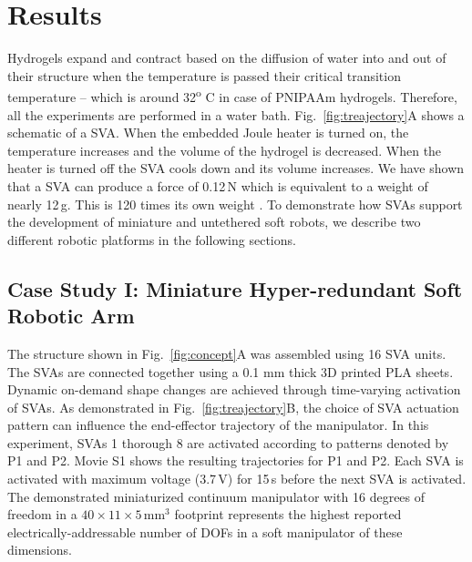\section{Results}
Hydrogels expand and contract based on the diffusion of water into and out of their structure when the temperature is passed their critical transition temperature -- which is around 32\textsuperscript{o} C in case of PNIPAAm hydrogels. Therefore, all the experiments are performed in a water bath. Fig.~\ref{fig:treajectory}A shows a schematic of a SVA. When the embedded Joule heater is turned on, the temperature increases and the volume of the hydrogel is decreased. When the heater is turned off the SVA cools down and its volume increases. We have shown that a SVA can produce a force of 0.12\,N which is equivalent to a weight of nearly 12\,g. This is 120 times its own weight \cite{Khodambashi2021}. To demonstrate how SVAs support the development of miniature and untethered soft robots, we describe two different robotic platforms in the following sections. 
\subsection{Case Study I: Miniature Hyper-redundant Soft Robotic Arm}
The structure shown in Fig.~\ref{fig:concept}A was assembled using 16 SVA units. The SVAs are connected together using a 0.1 mm thick 3D printed PLA sheets. Dynamic on-demand shape changes are achieved through time-varying activation of SVAs.
As demonstrated in Fig.~\ref{fig:treajectory}B, the choice of SVA actuation pattern can influence the end-effector trajectory of the manipulator. In this experiment, SVAs 1 thorough 8 are activated according to patterns denoted by P1 and P2. Movie S1 shows the resulting trajectories for P1 and P2.
Each SVA is activated with maximum voltage (3.7\,V) for 15\,s before the next SVA is activated.
The demonstrated miniaturized continuum manipulator with 16 degrees of freedom in a $40\times11\times5$\,mm$^3$ footprint represents the highest reported electrically-addressable number of DOFs in a soft manipulator of these dimensions. 
